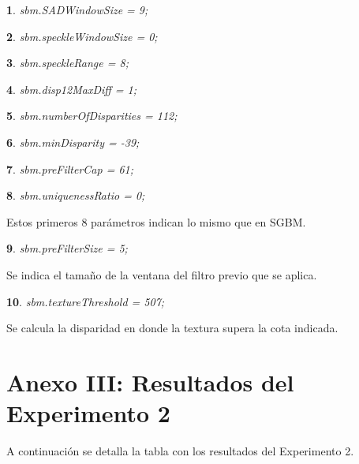 \documentclass[11pt,a4paper,titlepage]{article}
\newtheorem{mytheorem}{}
\newenvironment{theorem}%
  {\begin{lrbox}{\thmbox}%
   \begin{minipage}{\dimexpr\linewidth-2\fboxsep}
   \begin{mytheorem}}%
  {\end{mytheorem}%
   \end{minipage}%
   \end{lrbox}%
   \begin{trivlist}
     \item[]\colorbox{lightgray}{\usebox\thmbox}
   \end{trivlist}}
\begin{document}
\begin{theorem}
sbm.SADWindowSize = 9;
\end{theorem}
\begin{theorem}
sbm.speckleWindowSize = 0;
\end{theorem}
\begin{theorem}
sbm.speckleRange = 8;
\end{theorem}
\begin{theorem}
sbm.disp12MaxDiff = 1;
\end{theorem}
\begin{theorem}
sbm.numberOfDisparities = 112;
\end{theorem}
\begin{theorem}
sbm.minDisparity = -39;
\end{theorem}
\begin{theorem}
sbm.preFilterCap = 61;
\end{theorem}
\begin{theorem}
sbm.uniquenessRatio = 0;
\end{theorem}

Estos primeros 8 parámetros indican lo mismo que en SGBM.

\begin{theorem}
sbm.preFilterSize = 5;
\end{theorem}

Se indica el tamaño de la ventana del filtro previo que se aplica.

\begin{theorem}
sbm.textureThreshold = 507;
\end{theorem}

Se calcula la disparidad en donde la textura supera la cota indicada.

\newpage

\section{Anexo III: Resultados del Experimento 2}

A continuación se detalla la tabla con los resultados del Experimento 2.
\end{document}
